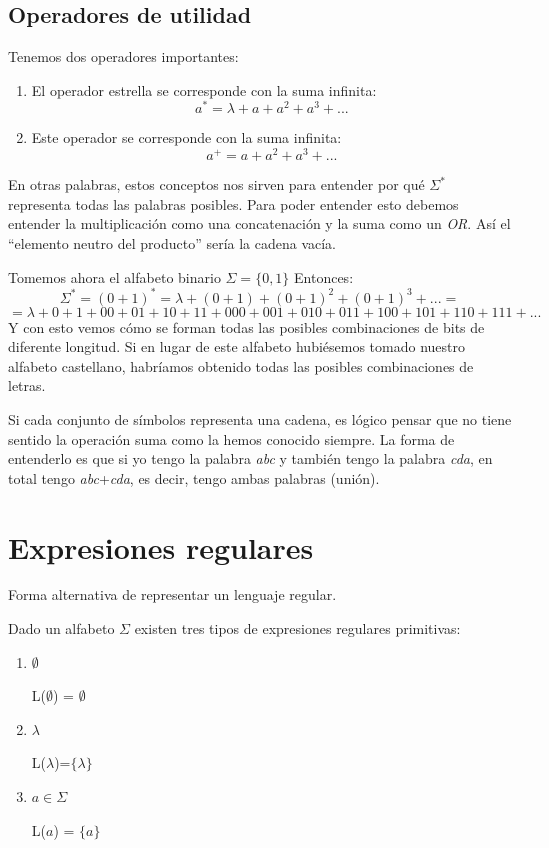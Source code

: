 \documentclass{apuntes}
\begin{document}
\subsection{Operadores de utilidad}
Tenemos dos operadores importantes:
\begin{enumerate}
\item \begin{defn}
El operador estrella se corresponde con la suma infinita:
\[a^* = \lambda + a + a^2 + a^3 + ...\]

\end{defn}
\item \begin{defn}
Este operador se corresponde con la suma infinita:
\[a^+ = a + a^2 + a^3 + ...\]
\end{defn}
\end{enumerate}
En otras palabras, estos conceptos nos sirven para entender por qué $\Sigma ^*$  representa todas las palabras posibles. Para poder entender esto debemos entender la multiplicación como una concatenación y la suma como un \textit{OR}. Así el ``elemento neutro del producto'' sería la cadena vacía.

Tomemos ahora el alfabeto binario $\Sigma = \lbrace 0, 1 \rbrace$
Entonces:
\[\Sigma ^* = (0+1)^* = \lambda + (0+1)+(0+1)^2+(0+1)^3+... = \]
\[= \lambda + 0 + 1 + 00 + 01 +10 +11 +000+001+010+011+100+101+110+111+...\]
Y con esto vemos cómo se forman todas las posibles combinaciones de bits de diferente longitud. Si en lugar de este alfabeto hubiésemos tomado nuestro alfabeto castellano, habríamos obtenido todas las posibles combinaciones de letras.

Si cada conjunto de símbolos representa una cadena, es lógico pensar que no tiene sentido la operación suma como la hemos conocido siempre. La forma de entenderlo es que si yo tengo la palabra \textit{abc} y también tengo la palabra \textit{cda}, en total tengo \textit{abc}+\textit{cda}, es decir, tengo ambas palabras (unión).

\section{Expresiones regulares}

\begin{defn}
Forma alternativa de representar un lenguaje regular.
\end{defn}

Dado un alfabeto $\Sigma$ existen tres tipos de expresiones regulares primitivas:
\begin{enumerate}
\item $\emptyset$

L($\emptyset$) = $\emptyset$
\item $\lambda$

 L($\lambda$)=$\lbrace \lambda \rbrace$
\item $a\in \Sigma$

L($a$) = $\lbrace a \rbrace$
\end{enumerate}
\end{document}
